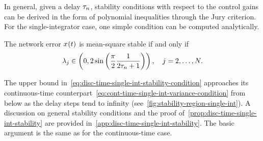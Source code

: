 In general, given a delay $ \tau_n $,
stability conditions with respect to the control gains can be derived
in the form of polynomial inequalities through the Jury criterion.
For the single-integrator case,
one simple condition can be computed analytically.  %
\begin{prop}\label{prop:disc-time-single-int-stability}
	{The network error $ x_{}(t) $ is mean-square stable} if and only if
	\begin{equation}\label{eq:disc-time-single-int-stability-condition}
		\lambda_j \in \left(0,2\sin\left(\dfrac{\pi}{2}\dfrac{1}{2\tau_n+1}\right)\right), \quad j = 2,\dots,N.
	\end{equation}
\end{prop}
The upper bound in~\eqref{eq:disc-time-single-int-stability-condition} approaches its continuous-time counterpart~\eqref{eq:cont-time-single-int-variance-condition} from below
as the delay steps tend to infinity (see~\autoref{fig:stability-region-single-int}). %
A discussion on general stability conditions
and the proof of~\cref{prop:disc-time-single-int-stability} are provided in~\cref{app:disc-time-single-int-stability}.
The basic argument is the same as for the continuous-time case.

